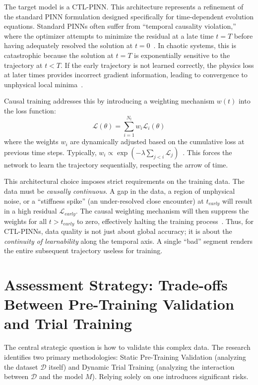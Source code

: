 \documentclass[11pt, a4paper]{article}
\begin{document}
The target model is a CTL-PINN. This architecture represents a refinement of the standard PINN formulation designed specifically for time-dependent evolution equations. Standard PINNs often suffer from ``temporal causality violation,'' where the optimizer attempts to minimize the residual at a late time $t=T$ before having adequately resolved the solution at $t=0$~\cite{ref10}. In chaotic systems, this is catastrophic because the solution at $t=T$ is exponentially sensitive to the trajectory at $t < T$. If the early trajectory is not learned correctly, the physics loss at later times provides incorrect gradient information, leading to convergence to unphysical local minima~\cite{ref10}.

Causal training addresses this by introducing a weighting mechanism $w(t)$ into the loss function:
\begin{equation}
    \mathcal{L}(\theta) = \sum_{i=1}^{N_t} w_i \mathcal{L}_i(\theta)
\end{equation}
where the weights $w_i$ are dynamically adjusted based on the cumulative loss at previous time steps. Typically, $w_i \propto \exp(-\lambda \sum_{j < i} \mathcal{L}_j)$~\cite{ref10}. This forces the network to learn the trajectory sequentially, respecting the arrow of time.

This architectural choice imposes strict requirements on the training data. The data must be \textit{causally continuous}. A gap in the data, a region of unphysical noise, or a ``stiffness spike'' (an under-resolved close encounter) at $t_{early}$ will result in a high residual $\mathcal{L}_{early}$. The causal weighting mechanism will then suppress the weights for all $t > t_{early}$ to zero, effectively halting the training process~\cite{ref10}. Thus, for CTL-PINNs, data quality is not just about global accuracy; it is about the \textit{continuity of learnability} along the temporal axis. A single ``bad'' segment renders the entire subsequent trajectory useless for training.

\section{Assessment Strategy: Trade-offs Between Pre-Training Validation and Trial Training}

The central strategic question is how to validate this complex data. The research identifies two primary methodologies: Static Pre-Training Validation (analyzing the dataset $\mathcal{D}$ itself) and Dynamic Trial Training (analyzing the interaction between $\mathcal{D}$ and the model $M$). Relying solely on one introduces significant risks.
\end{document}
